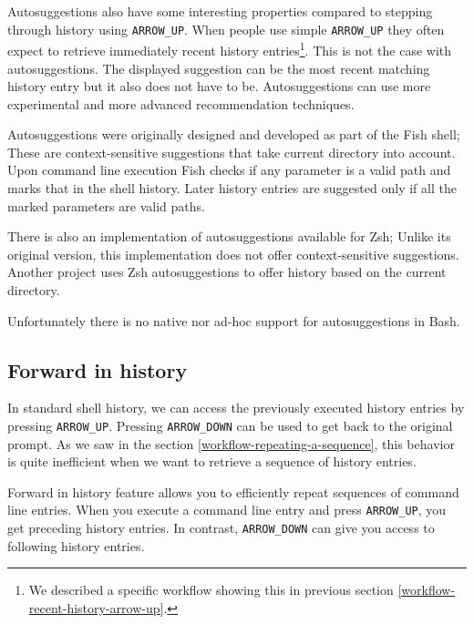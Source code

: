 Autosuggestions also have some interesting properties compared to stepping through history using \verb|ARROW_UP|.
When people use simple \verb|ARROW_UP| they often expect to retrieve immediately recent history entries\footnote{We described a specific workflow showing this in previous section \ref{workflow-recent-history-arrow-up}.}.  This is not the case with autosuggestions. The displayed suggestion can be the most recent matching history entry but it also does not have to be. Autosuggestions can use more experimental and more advanced recommendation techniques.

Autosuggestions were originally designed and developed as part of the Fish\cite{fishdocs} shell; These are context-sensitive suggestions that take current directory into account. Upon command line execution Fish checks if any parameter is a valid path and marks that in the shell history. Later history entries are suggested only if all the marked parameters are valid paths\cite{toolsfishissueautosuggestions}.

There is also an implementation of autosuggestions available for Zsh\cite{toolszshautosuggestions}; Unlike its original version, this implementation does not offer context-sensitive suggestions. Another project\cite{toolszshhistdb} uses Zsh autosuggestions to offer history based on the current directory.

Unfortunately there is no native nor ad-hoc support for autosuggestions in Bash. 



\subsection{Forward in history}

In standard shell history, we can access the previously executed history entries by pressing \verb|ARROW_UP|. Pressing \verb|ARROW_DOWN| can be used to get back to the original prompt.
As we saw in the section \ref{workflow-repeating-a-sequence}, this behavior is quite inefficient when we want to retrieve a sequence of history entries. %

Forward in history feature allows you to efficiently repeat sequences of command line entries. 
When you execute a command line entry and press \verb|ARROW_UP|, you get preceding history entries. In contrast, \verb|ARROW_DOWN| can give you access to following history entries.

